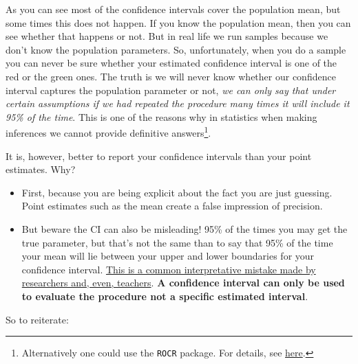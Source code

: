 \documentclass[]{book}
\providecommand{\tightlist}{%
  \setlength{\itemsep}{0pt}\setlength{\parskip}{0pt}}
\let\rmarkdownfootnote\footnote%
\def\footnote{\protect\rmarkdownfootnote}
\theoremstyle{definition}
\theoremstyle{definition}
\theoremstyle{definition}
\theoremstyle{remark}
\begin{document}
As you can see most of the confidence intervals cover the population
mean, but some times this does not happen. If you know the population
mean, then you can see whether that happens or not. But in real life we
run samples because we don't know the population parameters. So,
unfortunately, when you do a sample you can never be sure whether your
estimated confidence interval is one of the red or the green ones. The
truth is we will never know whether our confidence interval captures the
population parameter or not, \emph{we can only say that under certain
assumptions if we had repeated the procedure many times it will include
it 95\% of the time}. This is one of the reasons why in statistics when
making inferences we cannot provide definitive answers\footnote{Alternatively
  one could use the \texttt{ROCR} package. For details, see
  \href{http://rocr.bioinf.mpi-sb.mpg.de/}{here}.}.

It is, however, better to report your confidence intervals than your
point estimates. Why?

\begin{itemize}
\tightlist
\item
  First, because you are being explicit about the fact you are just
  guessing. Point estimates such as the mean create a false impression
  of precision.\\
\item
  But beware the CI can also be misleading! 95\% of the times you may
  get the true parameter, but that's not the same than to say that 95\%
  of the time your mean will lie between your upper and lower boundaries
  for your confidence interval.
  \href{http://link.springer.com/article/10.3758\%2Fs13423-013-0572-3}{This
  is a common interpretative mistake made by researchers and, even,
  teachers}. \textbf{A confidence interval can only be used to evaluate
  the procedure not a specific estimated interval}.
\end{itemize}

So to reiterate:
\end{document}
